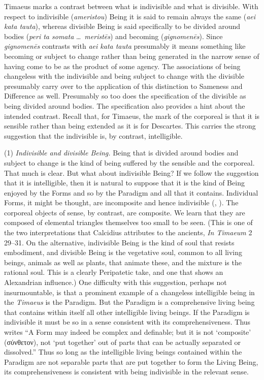 Timaeus marks a contrast between what is indivisible and what is divisible. With respect to indivisible (\emph{ameristou}) Being it is said to remain always the same (\emph{aei kata tauta}), whereas divisible Being is said specifically to be divided around bodies (\emph{peri ta somata} \ldots\ \emph{meristēs}) and becoming (\emph{gignomenēs}). Since \emph{gignomenēs} contrasts with \emph{aei kata tauta} presumably it means something like becoming or subject to change rather than being generated in the narrow sense of having come to be as the product of some agency. The associations of being changeless with the indivisible and being subject to change with the divisible presumably carry over to the application of this distinction to Sameness and Difference as well. Presumably so too does the specification of the divisible as being divided around bodies. The specification also provides a hint about the intended contrast. Recall that, for Timaeus, the mark of the corporeal is that it is sensible rather than being extended as it is for Descartes. This carries the strong suggestion that the indivisible is, by contrast, intelligible.

(1) \emph{Indivisible and divisible Being.} Being that is divided around bodies and subject to change is the kind of being suffered by the sensible and the corporeal. That much is clear. But what about indivisible Being? If we follow the suggestion that it is intelligible, then it is natural to suppose that it is the kind of Being enjoyed by the Forms and so by the Paradigm and all that it contains. Individual Forms, it might be thought, are incomposite and hence indivisible (\citealt[64]{Cornford:1935fk}, \citealt[71]{Robinson:1970lq}). The corporeal objects of sense, by contrast, are composite. We learn that they are composed of elemental triangles themselves too small to be seen. (This is one of the two interpretations that Calcidius attributes to the ancients, \emph{In Timaeum} 2 29--31. On the alternative, indivisible Being is the kind of soul that resists embodiment, and divisible Being is the vegetative soul, common to all living beings, animals as well as plants, that animate these, and the mixture is the rational soul. This is a clearly Peripatetic take, and one that shows an Alexandrian influence.) One difficulty with this suggestion, perhaps not insurmountable, is that a prominent example of a changeless intelligible being in the \emph{Timaeus} is the Paradigm. But the Paradigm is a comprehensive living being that contains within itself all other intelligible living beings. If the Paradigm is indivisible it must be so in a sense consistent with its comprehensiveness. Thus \citet[64]{Cornford:1935fk} writes ``A Form may indeed be complex and definable; but it is not `composite' ({\sbl σύνθετον}), not `put together' out of parts that can be actually separated or dissolved.'' Thus so long as the intelligible living beings contained within the Paradigm are not separable parts that are put together to form the Living Being, its comprehensiveness is consistent with being indivisible in the relevant sense.


